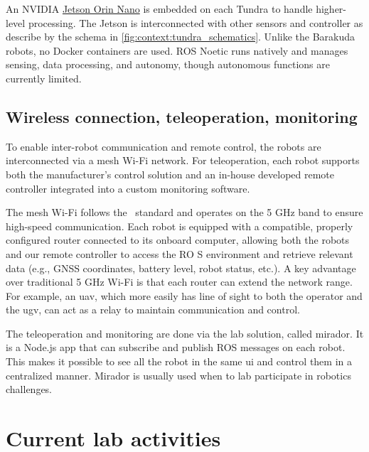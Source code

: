 An NVIDIA \href{https://www.nvidia.com/en-us/autonomous-machines/embedded-systems/jetson-orin/#nv-title-8b7137e4b5}{Jetson Orin Nano}
is embedded on each Tundra to handle higher-level processing.
The Jetson is interconnected with other sensors and controller as describe by the schema in \cref{fig:context:tundra_schematics}.
Unlike the Barakuda robots, no Docker containers are used.
ROS Noetic runs natively and manages sensing, data processing, and autonomy, though autonomous functions are currently limited.



\subsection{Wireless connection, teleoperation, monitoring}\label{subsec:wireless-connection-teleoperation-monitoring}

To enable inter-robot communication and remote control, the robots are interconnected via a mesh Wi-Fi network.
For teleoperation, each robot supports both the manufacturer's control solution and an in-house developed
remote controller integrated into a custom monitoring software.

The mesh Wi-Fi follows the~\cite{noauthor_ieee_2021} standard and operates on the 5 GHz band to ensure high-speed communication.
Each robot is equipped with a compatible, properly configured router connected to its onboard computer,
allowing both the robots and our remote controller to access the RO S environment and retrieve relevant
data (e.g., GNSS coordinates, battery level, robot status, etc.). A key advantage over traditional 5 GHz Wi-Fi is that each router can extend the network range.
For example, an \gls{uav}, which more easily has line of sight to both the operator and the \gls{ugv}, can act as a relay to maintain communication and control.

The teleoperation and monitoring are done via the lab solution, called mirador.
It is a Node.js app that can subscribe and publish ROS messages on each robot.
This makes it possible to see all the robot in the same \gls{ui} and control them in a centralized manner.
Mirador is usually used when to lab participate in robotics challenges.


\section{Current lab activities}\label{sec:current-lab-activities}

